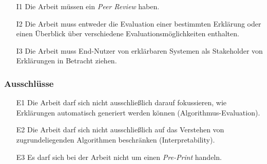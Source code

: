 \begin{enumerate}
    \item[I1] Die Arbeit müssen ein \textit{Peer Review} haben.
    \item[I2] Die Arbeit muss entweder die Evaluation einer bestimmten Erklärung oder einen Überblick über verschiedene Evaluationsmöglichkeiten enthalten.
    \item[I3] Die Arbeit muss End-Nutzer von erklärbaren Systemen als Stakeholder von Erklärungen in Betracht ziehen.
\end{enumerate}

\subsubsection{Ausschlüsse}

\begin{enumerate}
    \item[E1] Die Arbeit darf sich nicht ausschließlich darauf fokussieren, wie Erklärungen automatisch generiert werden können (Algorithmus-Evaluation).
    \item[E2] Die Arbeit darf sich nicht ausschließlich auf das Verstehen von zugrundeliegenden Algorithmen beschränken (Interpretability).
    \item[E3] Es darf sich bei der Arbeit nicht um einen \textit{Pre-Print} handeln. 
\end{enumerate}
